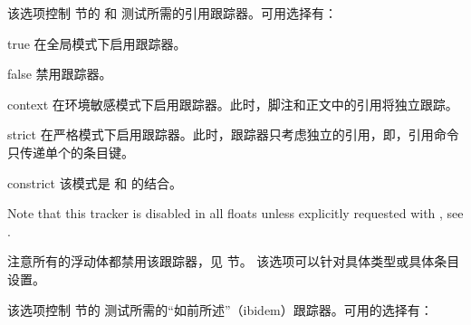 \begin{optionlist}

该选项控制  节的  和  测试所需的引用跟踪器。可用选择有：

\begin{valuelist}
\item[true] %
在全局模式下启用跟踪器。
\item[false] %
禁用跟踪器。
\item[context] %
在环境敏感模式下启用跟踪器。此时，脚注和正文中的引用将独立跟踪。
\item[strict] %
在严格模式下启用跟踪器。此时，跟踪器只考虑独立的引用，即，引用命令只传递单个的条目键。
\item[constrict] %
该模式是  和  的结合。
\end{valuelist}

Note that this tracker is disabled in all floats unless explicitly requested with , see .

注意所有的浮动体都禁用该跟踪器，见  节。
该选项可以针对具体类型或具体条目设置。



该选项控制  节的  测试所需的“如前所述”（ibidem）跟踪器。可用的选择有：


\end{optionlist}
